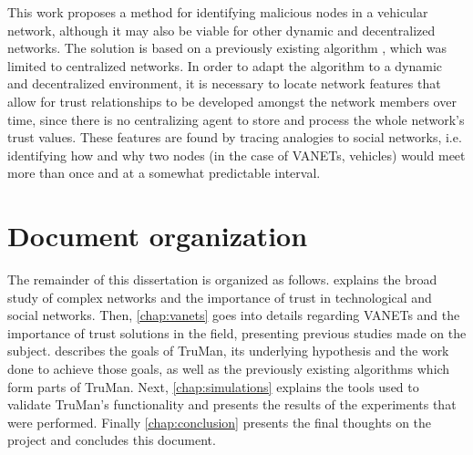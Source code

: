 %

This work proposes a method for identifying malicious nodes in a vehicular network, although it may also be viable for other dynamic and decentralized networks.
The solution is based on a previously existing algorithm \cite{vernize2015malicious}, which was limited to centralized networks.
In order to adapt the algorithm to a dynamic and decentralized environment, it is necessary to locate network features that allow for trust relationships to be developed amongst the network members over time, since there is no centralizing agent to store and process the whole network's trust values.
These features are found by tracing analogies to social networks, i.e. identifying how and why two nodes (in the case of VANETs, vehicles) would meet more than once and at a somewhat predictable interval.





\section{Document organization}
The remainder of this dissertation is organized as follows.  explains the broad study of complex networks and the importance of trust in technological and social networks.
Then, \autoref{chap:vanets} goes into details regarding VANETs and the importance of trust solutions in the field, presenting previous studies made on the subject.
 describes the goals of TruMan, its underlying hypothesis and the work done to achieve those goals, as well as the previously existing algorithms which form parts of TruMan.
Next, \autoref{chap:simulations} explains the tools used to validate TruMan's functionality and presents the results of the experiments that were performed.
Finally \autoref{chap:conclusion} presents the final thoughts on the project and concludes this document.

